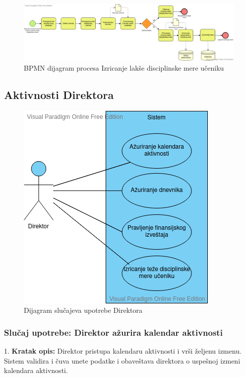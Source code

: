 \documentclass{article}
\begin{document}
\begin{landscape}
\begin{figure} [!ht]
    \begin{center}
        \includegraphics[scale=0.45]{imgs/BPMN_izricanje_lakse_disciplinske_mere.png}
    \end{center}
\caption{BPMN dijagram procesa Izricanje lakše disciplinske mere učeniku}
\end{figure}
\end{landscape}


\newpage
\subsection{Aktivnosti Direktora}

\begin{figure} [!ht]
    \begin{center}
        \includegraphics[scale=0.6]{imgs/direktor_use_case.png}
    \end{center}
\caption{Dijagram slučajeva upotrebe Direktora}
\end{figure}

\subsubsection{Slučaj upotrebe: Direktor ažurira kalendar aktivnosti}
1. \textbf{Kratak opis:} Direktor pristupa kalendaru aktivnosti i vrši željenu izmenu. Sistem validira i čuva unete podatke i obaveštava direktora o uspešnoj izmeni kalendara aktivnosti.\\
\end{document}
